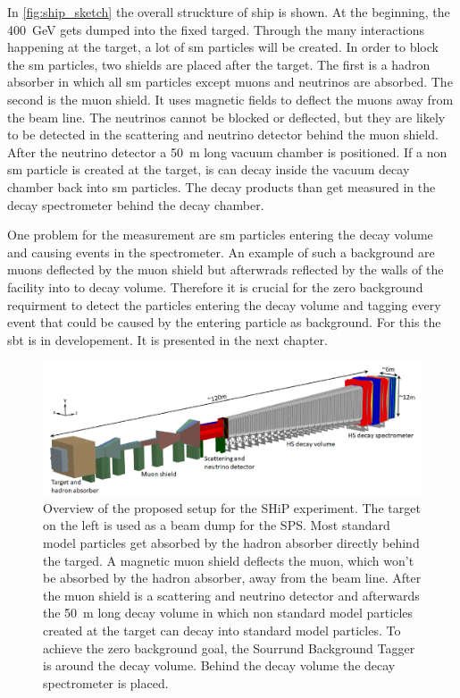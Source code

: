 In \autoref{fig:ship_sketch} the overall struckture of \ac{ship} is shown.
At the beginning, the \SI{400}{\giga\electronvolt} gets dumped into the fixed targed.
Through the many interactions happening at the target, a lot of \ac{sm} particles will be created.
In order to block the \ac{sm} particles, two shields are placed after the target.
The first is a hadron absorber in which all \ac{sm} particles except muons and neutrinos are absorbed.
The second is the muon shield. 
It uses magnetic fields to deflect the muons away from the beam line.
The neutrinos cannot be blocked or deflected, but they are likely to be detected in the scattering and neutrino detector behind the muon shield.
After the neutrino detector a \SI{50}{\meter} long vacuum chamber is positioned.
If a non \ac{sm} particle is created at the target, is can decay inside the vacuum decay chamber back into \ac{sm} particles.
The decay products than get measured in the decay spectrometer behind the decay chamber.

One problem for the measurement are \ac{sm} particles entering the decay volume and causing events in the spectrometer.
An example of such a background are muons deflected by the muon shield but afterwrads reflected by the walls of the facility into to decay volume.
Therefore it is crucial for the zero background requirment to detect the particles entering the decay volume and tagging every event that could be caused by the entering particle as background.
For this the \ac{sbt} is in developement.
It is presented in the next chapter.



\begin{figure}
	\centering
	\includegraphics[width=1.\textwidth]{pictures/ship_sketch}
	\caption[Overview of the SHiP experiment.]{Overview of the proposed setup for the SHiP experiment. The target on the left is used as a beam dump for the SPS. Most standard model particles get absorbed by the hadron absorber directly behind the targed. A magnetic muon shield deflects the muon, which won't be absorbed by the hadron absorber, away from the beam line. After the muon shield is a scattering and neutrino detector and afterwards the \SI{50}{\meter} long decay volume in which non standard model particles created at the target can decay into standard model particles. To achieve the zero background goal, the Sourrund Background Tagger is around the decay volume. Behind the decay volume the decay spectrometer is placed. \cite{ship_coll}}
	\label{fig:ship_sketch}
\end{figure}
